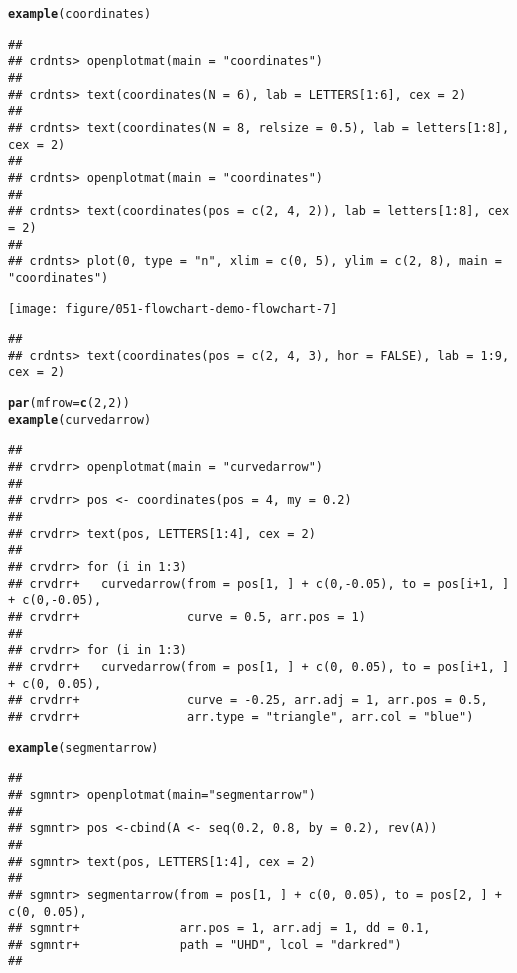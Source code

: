 \documentclass{article}\usepackage[]{graphicx}\usepackage[]{xcolor}
\makeatletter
\def\maxwidth{ %
  \ifdim\Gin@nat@width>\linewidth
    \linewidth
  \else
    \Gin@nat@width
  \fi
}
\newcommand{\hlnum}[1]{\textcolor[rgb]{0.686,0.059,0.569}{#1}}%
\newcommand{\hldef}[1]{\textcolor[rgb]{0.345,0.345,0.345}{#1}}%
\newcommand{\hlkwc}[1]{\textcolor[rgb]{0.333,0.667,0.333}{#1}}%
\newcommand{\hlkwd}[1]{\textcolor[rgb]{0.737,0.353,0.396}{\textbf{#1}}}%
\newenvironment{kframe}{%
 \def\at@end@of@kframe{}%
 \ifinner\ifhmode%
  \def\at@end@of@kframe{\end{minipage}}%
  \begin{minipage}{\columnwidth}%
 \fi\fi%
 \def\FrameCommand##1{\hskip\@totalleftmargin \hskip-\fboxsep
 \colorbox{shadecolor}{##1}\hskip-\fboxsep
     \hskip-\linewidth \hskip-\@totalleftmargin \hskip\columnwidth}%
 \MakeFramed {\advance\hsize-\width
   \@totalleftmargin\z@ \linewidth\hsize
   \@setminipage}}%
 {\par\unskip\endMakeFramed%
 \at@end@of@kframe}
\newenvironment{knitrout}{}{} %
\makeatother
\begin{document}
\begin{knitrout}
\begin{kframe}
\begin{verbatim}
\end{verbatim}
\begin{alltt}
\hlkwd{example}\hldef{(coordinates)}
\end{alltt}
\begin{verbatim}
## 
## crdnts> openplotmat(main = "coordinates")
## 
## crdnts> text(coordinates(N = 6), lab = LETTERS[1:6], cex = 2)
## 
## crdnts> text(coordinates(N = 8, relsize = 0.5), lab = letters[1:8], cex = 2)
## 
## crdnts> openplotmat(main = "coordinates")
## 
## crdnts> text(coordinates(pos = c(2, 4, 2)), lab = letters[1:8], cex = 2)
## 
## crdnts> plot(0, type = "n", xlim = c(0, 5), ylim = c(2, 8), main = "coordinates")
\end{verbatim}
\end{kframe}
\texttt{[image: figure/051-flowchart-demo-flowchart-7]} 
\begin{kframe}\begin{verbatim}
## 
## crdnts> text(coordinates(pos = c(2, 4, 3), hor = FALSE), lab = 1:9, cex = 2)
\end{verbatim}
\begin{alltt}
\hlkwd{par}\hldef{(}\hlkwc{mfrow} \hldef{=} \hlkwd{c}\hldef{(}\hlnum{2}\hldef{,} \hlnum{2}\hldef{))}
\hlkwd{example}\hldef{(curvedarrow)}
\end{alltt}
\begin{verbatim}
## 
## crvdrr> openplotmat(main = "curvedarrow")
## 
## crvdrr> pos <- coordinates(pos = 4, my = 0.2)
## 
## crvdrr> text(pos, LETTERS[1:4], cex = 2)
## 
## crvdrr> for (i in 1:3) 
## crvdrr+   curvedarrow(from = pos[1, ] + c(0,-0.05), to = pos[i+1, ] + c(0,-0.05),
## crvdrr+               curve = 0.5, arr.pos = 1)
## 
## crvdrr> for (i in 1:3) 
## crvdrr+   curvedarrow(from = pos[1, ] + c(0, 0.05), to = pos[i+1, ] + c(0, 0.05),
## crvdrr+               curve = -0.25, arr.adj = 1, arr.pos = 0.5, 
## crvdrr+               arr.type = "triangle", arr.col = "blue")
\end{verbatim}
\begin{alltt}
\hlkwd{example}\hldef{(segmentarrow)}
\end{alltt}
\begin{verbatim}
## 
## sgmntr> openplotmat(main="segmentarrow")
## 
## sgmntr> pos <-cbind(A <- seq(0.2, 0.8, by = 0.2), rev(A))
## 
## sgmntr> text(pos, LETTERS[1:4], cex = 2)
## 
## sgmntr> segmentarrow(from = pos[1, ] + c(0, 0.05), to = pos[2, ] + c(0, 0.05),
## sgmntr+              arr.pos = 1, arr.adj = 1, dd = 0.1, 
## sgmntr+              path = "UHD", lcol = "darkred")
## 

\end{verbatim}
\end{kframe}
\end{knitrout}
\end{document}
